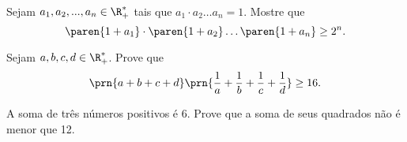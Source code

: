 \begin{exercise}
  Sejam $a_1, a_2, ..., a_n \in \R^\ast_+$ tais que $a_1 \cdot a_2 \dots a_n = 1$. Mostre que $$\paren{1 + a_1 } \cdot \paren{1 + a_2} \dots \paren{1 + a_n } \geq 2^n.$$
\end{exercise}

\begin{exercise}
Sejam $a, b, c, d \in \R_+^*$. Prove que $$\prn {a+b+c+d}
\prn {\frac 1 a + \frac 1 b + \frac 1 c + \frac 1 d} \geq 16.$$
\end{exercise}


\begin{exercise}
A soma de três números positivos é 6. Prove que a soma de seus
quadrados não é menor que 12.
\end{exercise}
